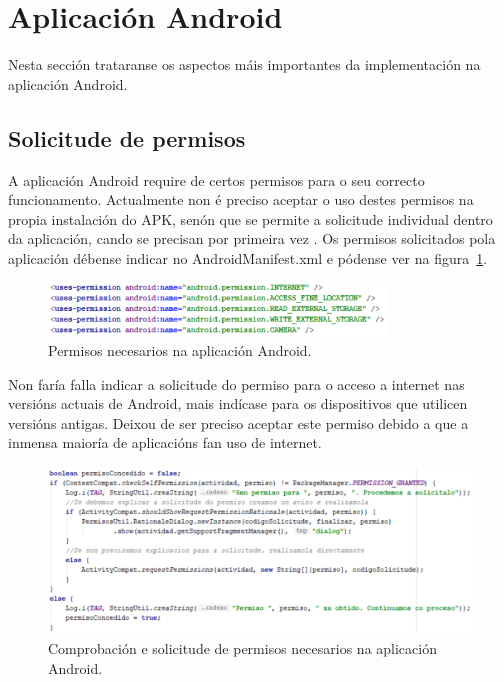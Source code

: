 \section{Aplicación Android}
Nesta sección trataranse os aspectos máis importantes da implementación na aplicación Android.

\subsection{Solicitude de permisos}
A aplicación Android require de certos permisos para o seu correcto funcionamento. Actualmente non é preciso aceptar o uso destes permisos na propia instalación do APK, senón que se permite a solicitude individual dentro da aplicación, cando se precisan por primeira vez \cite{androidSolicitudePermisos}. Os permisos solicitados pola aplicación débense indicar no AndroidManifest.xml e pódense ver na figura~\ref{fig:permisos}.

\begin{figure}[htb] 
	\begin{center}
		\includegraphics[width=0.8\textwidth]{figures/codigo/permisos}
		\caption{Permisos necesarios na aplicación Android.}
		\label{fig:permisos}
	\end{center}
\end{figure}

Non faría falla indicar a solicitude do permiso para o acceso a internet nas versións actuais de Android, mais indícase para os dispositivos que utilicen versións antigas. Deixou de ser preciso aceptar este permiso debido a que a inmensa maioría de aplicacións fan uso de internet.

\begin{figure}[htb] 
	\begin{center}
		\includegraphics[width=1\textwidth]{figures/codigo/solicitudePermisos}
		\caption{Comprobación e solicitude de permisos necesarios na aplicación Android.}
		\label{fig:solicitudePermisos}
	\end{center}
\end{figure}

